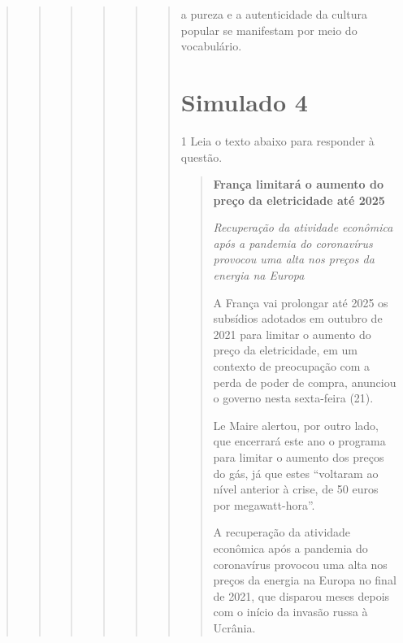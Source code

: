 \begin{quote}
\begin{quote}
\begin{quote}
\begin{quote}
\begin{quote}
\begin{quote}
\begin{escolha}
    \item a pureza e a autenticidade da cultura popular se manifestam por meio do vocabulário.

\end{escolha}


\chapter{Simulado 4}

\num{1} Leia o texto abaixo para responder à questão. 

\begin{quote}

\textbf{França limitará o aumento do preço da eletricidade até 2025}

\textit{Recuperação da atividade econômica após a pandemia do coronavírus
provocou uma alta nos preços da energia na Europa}

A França vai prolongar até 2025 os subsídios adotados em outubro de 2021
para limitar o aumento do preço da eletricidade, em um contexto de
preocupação com a perda de poder de compra, anunciou o governo nesta
sexta-feira (21).

Le Maire alertou, por outro lado, que encerrará este ano o programa para
limitar o aumento dos preços do gás, já que estes ``voltaram ao nível
anterior à crise, de 50 euros por megawatt-hora''.

A recuperação da atividade econômica após a pandemia do coronavírus
provocou uma alta nos preços da energia na Europa no final de 2021, que
disparou meses depois com o início da invasão russa à Ucrânia.

\end{quote}



\end{quote}
\end{quote}
\end{quote}
\end{quote}
\end{quote}
\end{quote}
